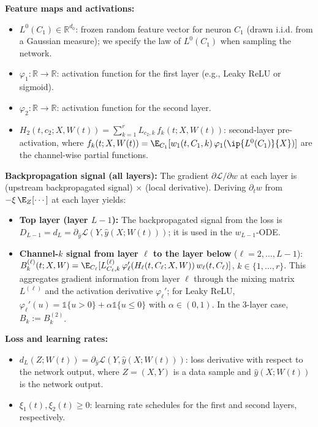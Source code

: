 \documentclass[nohyperref]{article}
\theoremstyle{plain}
\theoremstyle{definition}
\theoremstyle{remark}
\begin{document}
\textbf{Feature maps and activations:}
\begin{itemize}
\item $L^0(C_1) \in \mathbb{R}^{d_0}$: frozen random feature vector for neuron $C_1$ (drawn i.i.d. from a Gaussian measure); we specify the law of $L^0(C_1)$ when sampling the network.
\item $\varphi_1: \mathbb{R} \to \mathbb{R}$: activation function for the first layer (e.g., Leaky ReLU or sigmoid).
\item $\varphi_2: \mathbb{R} \to \mathbb{R}$: activation function for the second layer.
\item $H_2(t, c_2; X, W(t)) = \sum_{k=1}^r L_{c_2,k}\,f_k(t; X, W(t))$: second-layer pre-activation, where $f_k(t; X, W(t)) = \E_{C_1}[w_1(t, C_1, k)\,\varphi_1(\ip{L^0(C_1)}{X})]$ are the channel-wise partial functions.
\end{itemize}

\textbf{Backpropagation signal (all layers):}
The gradient $\partial\mathscr{L}/\partial w$ at each layer is (upstream backpropagated signal) $\times$ (local derivative). Deriving $\partial_t w$ from $-\xi\,\E_Z[\cdots]$ at each layer yields:
\begin{itemize}
\item \textbf{Top layer (layer $L-1$):} The backpropagated signal from the loss is $D_{L-1}=d_L=\partial_{\hat{y}}\mathscr{L}(Y,\hat{y}(X;W(t)))$; it is used in the $w_{L-1}$-ODE.
\item \textbf{Channel-$k$ signal from layer $\ell$ to the layer below} ($\ell=2,\ldots,L-1$): $B_k^{(\ell)}(t;X,W) = \E_{C_\ell}[L^{(\ell)}_{C_\ell,k}\,\varphi_\ell'(H_\ell(t,C_\ell;X,W))\,w_\ell(t,C_\ell)]$, $k\in\{1,\ldots,r\}$. This aggregates gradient information from layer $\ell$ through the mixing matrix $L^{(\ell)}$ and the activation derivative $\varphi_\ell'$; for Leaky ReLU, $\varphi_\ell'(u)=\mathds{1}\{u>0\}+\alpha\mathds{1}\{u\le 0\}$ with $\alpha\in(0,1)$. In the 3-layer case, $B_k:=B_k^{(2)}$.
\end{itemize}

\textbf{Loss and learning rates:}
\begin{itemize}
\item $d_L(Z; W(t)) = \partial_{\hat{y}} \mathscr{L}(Y, \hat{y}(X; W(t)))$: loss derivative with respect to the network output, where $Z = (X, Y)$ is a data sample and $\hat{y}(X; W(t))$ is the network output.
\item $\xi_1(t), \xi_2(t) \ge 0$: learning rate schedules for the first and second layers, respectively.
\end{itemize}
\end{document}
